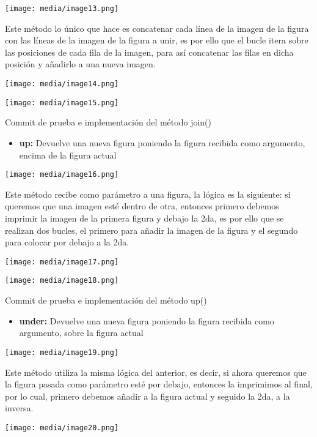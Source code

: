 \documentclass[
]{article}
\begin{document}
\texttt{[image: media/image13.png]}

Este método lo único que hace es concatenar cada línea de la imagen de
la figura con las líneas de la imagen de la figura a unir, es por ello
que el bucle itera sobre las posiciones de cada fila de la imagen, para
así concatenar las filas en dicha posición y añadirlo a una nueva
imagen.

\texttt{[image: media/image14.png]}

\texttt{[image: media/image15.png]}

Commit de prueba e implementación del método join()

\begin{itemize}
\item
  \textbf{up:} Devuelve una nueva figura poniendo la figura recibida
  como argumento, encima de la figura actual
\end{itemize}

\texttt{[image: media/image16.png]}

Este método recibe como parámetro a una figura, la lógica es la
siguiente: si queremos que una imagen esté dentro de otra, entonces
primero debemos imprimir la imagen de la primera figura y debajo la 2da,
es por ello que se realizan dos bucles, el primero para añadir la imagen
de la figura y el segundo para colocar por debajo a la 2da.

\texttt{[image: media/image17.png]}

\texttt{[image: media/image18.png]}

Commit de prueba e implementación del método up()

\begin{itemize}
\item
  \textbf{under:} Devuelve una nueva figura poniendo la figura recibida
  como argumento, sobre la figura actual
\end{itemize}

\texttt{[image: media/image19.png]}

Este método utiliza la misma lógica del anterior, es decir, si ahora
queremos que la figura pasada como parámetro esté por debajo, entonces
la imprimimos al final, por lo cual, primero debemos añadir a la figura
actual y seguido la 2da, a la inversa.

\texttt{[image: media/image20.png]}
\end{document}
